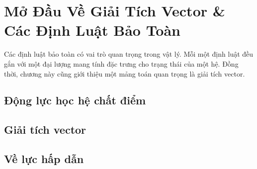   
\chapter{Mở Đầu Về Giải Tích Vector \& Các Định Luật Bảo Toàn}
Các định luật bảo toàn có vai trò quan trọng trong vật lý. 
Mỗi một định luật đều gắn với một đại lượng mang tính đặc trưng cho trạng thái của một hệ. 
Đồng thời, chương này cũng giới thiệu một mảng toán quan trọng là giải tích vector.



\section{Động lực học hệ chất điểm}


\section{Giải tích vector}

\section{Về lực hấp dẫn}